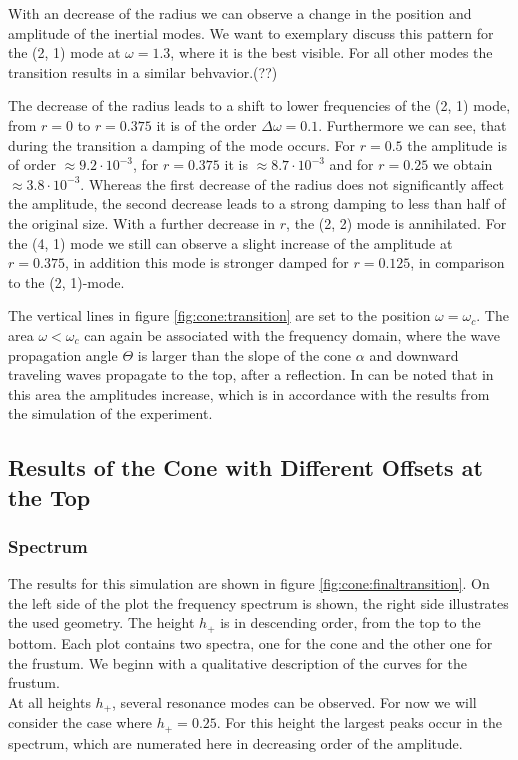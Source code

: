 With an decrease of the radius we can observe a change in the position and amplitude of the
inertial modes. We want to exemplary discuss this pattern for the (2, 1) mode at $\omega=1.3$, where it is the best visible.
For all other modes the transition results in a similar behvavior.(??)

The decrease of the radius leads to a shift to lower frequencies of the (2, 1) mode,
from $r=0$ to $r=0.375$ it is of the order $\Delta \omega=0.1$.
Furthermore we can see, that during the transition a damping of the mode occurs.
For $r=0.5$ the amplitude is of order $\approx9.2\cdot10^{-3}$, for $r=0.375$ it is
$\approx8.7\cdot10^{-3}$ and for $r=0.25$ we obtain $\approx3.8\cdot10^{-3}$.
Whereas the first decrease of the radius does not significantly affect the amplitude,
the second decrease leads to a strong damping to less than half of the original size.
With a further decrease in $r$, the (2, 2) mode is annihilated.
For the (4, 1) mode we still can observe a slight increase of the amplitude at $r=0.375$,
in addition this mode is stronger damped for $r=0.125$, in comparison to the (2, 1)-mode.

The vertical lines in figure \ref{fig:cone:transition} are set to the position $\omega=\omega_c$.
The area $\omega<\omega_c$ can again be associated with the frequency domain, where the wave propagation angle $\Theta$ is larger than
the  slope of the cone $\alpha$ and downward traveling waves propagate to the top, after a reflection.
In can be noted that in this area the amplitudes increase, which is in accordance with the
results from the simulation of the experiment.




\clearpage


\subsection{Results of the Cone with Different Offsets at the Top}
\subsubsection{Spectrum}

The results for this simulation are shown in figure \ref{fig:cone:finaltransition}.
On the left side of the plot  the frequency spectrum is shown, the right side illustrates the used geometry.
The height $h_+$ is in descending order, from the top to the bottom.
Each plot contains two spectra, one for the cone  and the other one for the frustum.
We beginn with a qualitative description of the curves for the frustum.\\
At all heights $h_+$, several resonance modes can be observed. For now we will consider the case where ${h_+=0.25}$.
For this height the largest peaks occur in the spectrum, which are numerated here in decreasing order of the amplitude.

